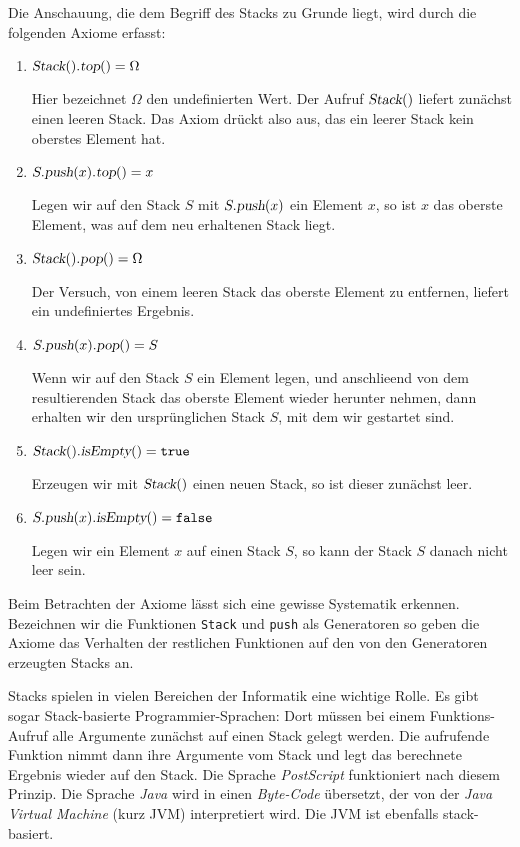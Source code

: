 Die Anschauung, die dem  Begriff des Stacks zu Grunde liegt, wird durch die folgenden Axiome
erfasst:
\begin{enumerate}
\item $\textsl{Stack}().\textsl{top}() = \Omega$

      Hier bezeichnet $\Omega$ den undefinierten Wert.  Der Aufruf $\textsl{Stack}()$
      liefert zun\"achst einen leeren Stack.  Das Axiom dr\"uckt also aus,
      das ein leerer Stack kein oberstes Element hat.
\item $S.\textsl{push}(x).\textsl{top}() = x$

      Legen wir auf den Stack $S$ mit $S.\textsl{push}(x)$ ein Element $x$, so 
      ist $x$ das oberste Element, was auf dem neu erhaltenen Stack liegt.
\item $\textsl{Stack}().\textsl{pop}() = \Omega$

      Der Versuch, von einem leeren Stack das oberste Element zu entfernen,
      liefert ein undefiniertes Ergebnis.
\item $S.\textsl{push}(x).\textsl{pop}() = S$

      Wenn wir auf den Stack $S$
      ein Element legen, und anschlie\3end von dem resultierenden Stack das
      oberste Element wieder herunter nehmen, dann erhalten wir den
      urspr\"unglichen Stack $S$, mit dem wir gestartet sind.
\item $\textsl{Stack}().\textsl{isEmpty}() = \mathtt{true}$

      Erzeugen wir mit $\textsl{Stack}()$ einen neuen Stack, so ist dieser
      zun\"achst leer.
\item $S.\textsl{push}(x).\textsl{isEmpty}() = \mathtt{false}$

      Legen wir ein Element $x$ auf einen Stack $S$, so kann der Stack $S$
      danach nicht leer sein.
\end{enumerate}
Beim Betrachten der Axiome l\"asst sich eine gewisse Systematik erkennen.
Bezeichnen wir die Funktionen \texttt{Stack} und \texttt{push} als Generatoren
so geben die Axiome das Verhalten der restlichen Funktionen auf den von den Generatoren
erzeugten Stacks an. 

Stacks spielen in vielen Bereichen der Informatik eine wichtige Rolle.  Es gibt
sogar Stack-basierte Programmier-Sprachen: Dort m\"ussen bei einem
Funktions-Aufruf alle Argumente zun\"achst auf einen Stack gelegt werden.  Die
aufrufende Funktion nimmt dann ihre Argumente vom Stack und legt das berechnete
Ergebnis wieder auf den Stack.  Die Sprache \textsl{PostScript} funktioniert
nach diesem Prinzip.  Die Sprache \textsl{Java} wird in einen \emph{Byte-Code}
\"ubersetzt, der von der \emph{Java Virtual Machine} (kurz JVM) interpretiert
wird.  Die JVM ist ebenfalls stack-basiert.

